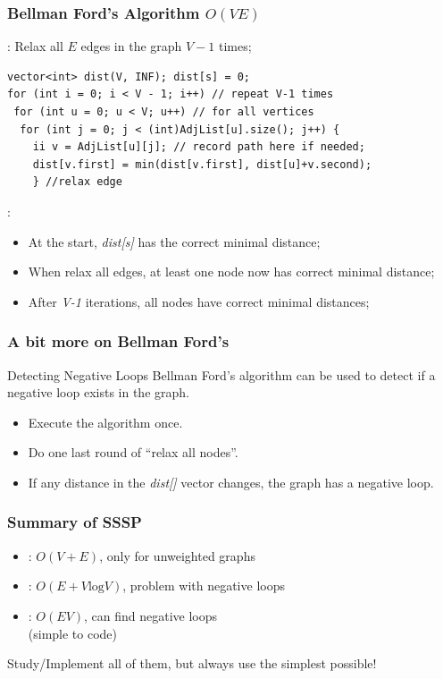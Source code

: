\documentclass{beamer}
\begin{document}
\begin{frame}
  \frametitle{Bellman Ford's Algorithm $O(VE)$}

  {\smaller
  : Relax all $E$ edges in the graph $V-1$ times;

  \begin{exampleblock}{}
\begin{verbatim}
vector<int> dist(V, INF); dist[s] = 0;
for (int i = 0; i < V - 1; i++) // repeat V-1 times
 for (int u = 0; u < V; u++) // for all vertices
  for (int j = 0; j < (int)AdjList[u].size(); j++) {
    ii v = AdjList[u][j]; // record path here if needed;
    dist[v.first] = min(dist[v.first], dist[u]+v.second);
    } //relax edge
\end{verbatim}
  \end{exampleblock}
  
  \medskip

  :
  \begin{itemize}
  \item At the start, \emph{dist[s]} has the correct minimal distance;
  \item When relax all edges, at least one node now has correct minimal distance;
  \item After \emph{V-1} iterations, all nodes have correct minimal distances;
  \end{itemize}
  }
\end{frame}

\begin{frame}
  \frametitle{A bit more on Bellman Ford's}
  {\smaller
  \begin{block}{Detecting Negative Loops}
    Bellman Ford's algorithm can be used to detect if a negative loop
    exists in the graph.  

    \medskip

    \begin{itemize}
      \item Execute the algorithm once. 
      \item Do one last round of ``relax all nodes''. 
      \item If any distance in the \emph{dist[]} vector changes, the graph has a negative loop.
    \end{itemize}
  \end{block}}
\end{frame}


\begin{frame}
  \frametitle{Summary of SSSP}
  \begin{itemize}
  \item {}: $O(V+E)$, only for unweighted graphs
  \item {}: $O(E+V\text{log}V)$, problem with negative loops
  \item {}: $O(EV)$, can find negative loops\\(simple to code)
  \end{itemize}

  \bigskip

  Study/Implement all of them, but always use the simplest possible!
\end{frame}
\end{document}
